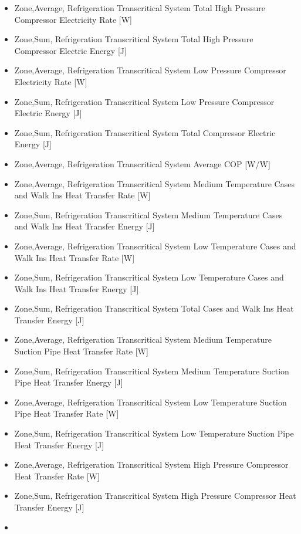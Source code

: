 \begin{itemize}
\item
  Zone,Average, Refrigeration Transcritical System Total High Pressure Compressor Electricity Rate {[}W{]}
\item
  Zone,Sum, Refrigeration Transcritical System Total High Pressure Compressor Electric Energy {[}J{]}
\item
  Zone,Average, Refrigeration Transcritical System Low Pressure Compressor Electricity Rate {[}W{]}
\item
  Zone,Sum, Refrigeration Transcritical System Low Pressure Compressor Electric Energy {[}J{]}
\item
  Zone,Sum, Refrigeration Transcritical System Total Compressor Electric Energy {[}J{]}
\item
  Zone,Average, Refrigeration Transcritical System Average COP {[}W/W{]}
\item
  Zone,Average, Refrigeration Transcritical System Medium Temperature Cases and Walk Ins Heat Transfer Rate {[}W{]}
\item
  Zone,Sum, Refrigeration Transcritical System Medium Temperature Cases and Walk Ins Heat Transfer Energy {[}J{]}
\item
  Zone,Average, Refrigeration Transcritical System Low Temperature Cases and Walk Ins Heat Transfer Rate {[}W{]}
\item
  Zone,Sum, Refrigeration Transcritical System Low Temperature Cases and Walk Ins Heat Transfer Energy {[}J{]}
\item
  Zone,Sum, Refrigeration Transcritical System Total Cases and Walk Ins Heat Transfer Energy {[}J{]}
\item
  Zone,Average, Refrigeration Transcritical System Medium Temperature Suction Pipe Heat Transfer Rate {[}W{]}
\item
  Zone,Sum, Refrigeration Transcritical System Medium Temperature Suction Pipe Heat Transfer Energy {[}J{]}
\item
  Zone,Average, Refrigeration Transcritical System Low Temperature Suction Pipe Heat Transfer Rate {[}W{]}
\item
  Zone,Sum, Refrigeration Transcritical System Low Temperature Suction Pipe Heat Transfer Energy {[}J{]}
\item
  Zone,Average, Refrigeration Transcritical System High Pressure Compressor Heat Transfer Rate {[}W{]}
\item
  Zone,Sum, Refrigeration Transcritical System High Pressure Compressor Heat Transfer Energy {[}J{]}
\item

\end{itemize}

